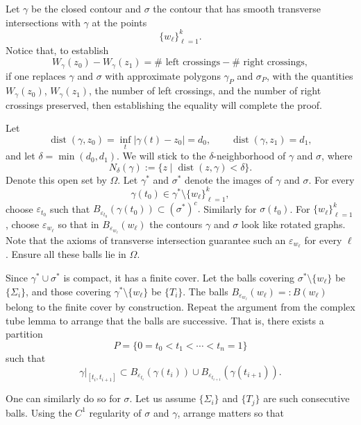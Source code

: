 \documentclass[11pt,a4paper]{article}
\begin{document}
Let \(\gamma\) be the closed contour and \(\sigma\) the contour that has smooth transverse intersections with \(\gamma\) at the points
\[
  \{w_\ell\}_{\ell=1}^k.
\]
Notice that, to establish
\[
  W_\gamma(z_0)-W_\gamma(z_1)
  =\#\text{ left crossings}-\#\text{ right crossings},
\]
if one replaces \(\gamma\) and \(\sigma\) with approximate polygons \(\gamma_P\) and \(\sigma_P\), with the quantities \(W_\gamma(z_0)\), \(W_\gamma(z_1)\), the number of left crossings, and the number of right crossings preserved, then establishing the equality will complete the proof.

Let
\[
  \operatorname{dist}(\gamma,z_0)=\inf_t|\gamma(t)-z_0|=d_0,
  \qquad
  \operatorname{dist}(\gamma,z_1)=d_1,
\]
and let \(\delta=\min(d_0,d_1)\). We will stick to the \(\delta\)-neighborhood of \(\gamma\) and \(\sigma\), where
\[
  N_\delta(\gamma):=\{z\mid\operatorname{dist}(z,\gamma)<\delta\}.
\]
Denote this open set by \(\Omega\). Let \(\gamma^*\) and \(\sigma^*\) denote the images of \(\gamma\) and \(\sigma\). For every
\[
  \gamma(t_0)\in\gamma^*\setminus\{w_\ell\}_{\ell=1}^k,
\]
choose \(\varepsilon_{t_0}\) such that \(B_{\varepsilon_{t_0}}(\gamma(t_0))\subset(\sigma^*)^c.\)
Similarly for \(\sigma(t_0)\). For \(\{w_\ell\}_{\ell=1}^k\), choose \(\varepsilon_{w_\ell}\) so that in \(B_{\varepsilon_{w_\ell}}(w_\ell)\) the contours \(\gamma\) and \(\sigma\) look like rotated graphs. Note that the axioms of transverse intersection guarantee such an \(\varepsilon_{w_\ell}\) for every \(\ell\). Ensure all these balls lie in \(\Omega\).

Since \(\gamma^*\cup\sigma^*\) is compact, it has a finite cover. Let the balls covering \(\sigma^*\setminus\{w_\ell\}\) be \(\{\Sigma_i\}\), and those covering \(\gamma^*\setminus\{w_\ell\}\) be \(\{T_i\}\). The balls \(B_{\varepsilon_{w_\ell}}(w_\ell)=:B(w_\ell)\) belong to the finite cover by construction. Repeat the argument from the complex tube lemma to arrange that the balls are successive. That is, there exists a partition
\[
  P=\{0=t_0<t_1<\cdots<t_n=1\}
\]
such that
\[
  \left.\gamma\right|_{[t_i,t_{i+1}]}
  \subset B_{\varepsilon_{t_i}}(\gamma(t_i))
  \cup B_{\varepsilon_{t_{i+1}}}(\gamma(t_{i+1})).
\]

One can similarly do so for \(\sigma\). Let us assume \(\{\Sigma_i\}\) and \(\{T_j\}\) are such consecutive balls. Using the \(C^1\) regularity of \(\sigma\) and \(\gamma\), arrange matters so that
\end{document}
